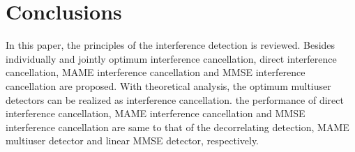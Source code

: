 \documentclass[a4paper,12pt,fleqn]{article}
\begin{document}
\section{Conclusions}

In this paper, the principles of the interference detection is
reviewed. Besides individually and jointly optimum interference
cancellation, direct interference cancellation, MAME interference
cancellation and MMSE interference cancellation are proposed. With
theoretical analysis, the optimum multiuser detectors can be
realized as interference cancellation. the performance of direct
interference cancellation, MAME interference cancellation and MMSE
interference cancellation are same to that of the decorrelating
detection, MAME multiuser detector and linear MMSE detector,
respectively.



\end{document}
